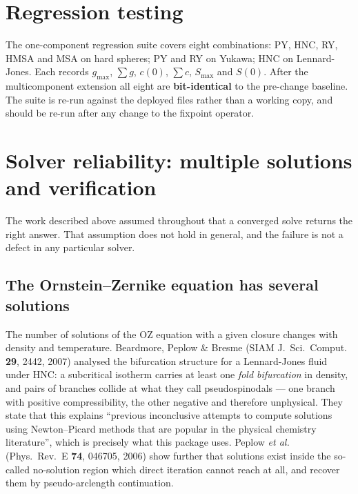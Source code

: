 \documentclass[11pt,a4paper]{article}
\begin{document}
\section{Regression testing}
\label{sec:regression}

The one-component regression suite covers eight combinations: PY, HNC, RY,
HMSA and MSA on hard spheres; PY and RY on Yukawa; HNC on Lennard-Jones. Each
records $g_{\max}$, $\sum g$, $c(0)$, $\sum c$, $S_{\max}$ and $S(0)$. After
the multicomponent extension all eight are \textbf{bit-identical} to the
pre-change baseline. The suite is re-run against the deployed files rather
than a working copy, and should be re-run after any change to the fixpoint
operator.

\section{Solver reliability: multiple solutions and verification}

The work described above assumed throughout that a converged solve returns
the right answer. That assumption does not hold in general, and the failure
is not a defect in any particular solver.

\subsection{The Ornstein--Zernike equation has several solutions}

The number of solutions of the OZ equation with a given closure changes with
density and temperature. Beardmore, Peplow \& Bresme (SIAM J.\ Sci.\ Comput.
\textbf{29}, 2442, 2007) analysed the bifurcation structure for a
Lennard-Jones fluid under HNC: a subcritical isotherm carries at least one
\emph{fold bifurcation} in density, and pairs of branches collide at what
they call pseudospinodals --- one branch with positive compressibility, the
other negative and therefore unphysical. They state that this explains
``previous inconclusive attempts to compute solutions using Newton--Picard
methods that are popular in the physical chemistry literature'', which is
precisely what this package uses. Peplow \emph{et al.} (Phys.\ Rev.\ E
\textbf{74}, 046705, 2006) show further that solutions exist inside the
so-called no-solution region which direct iteration cannot reach at all, and
recover them by pseudo-arclength continuation.
\end{document}
